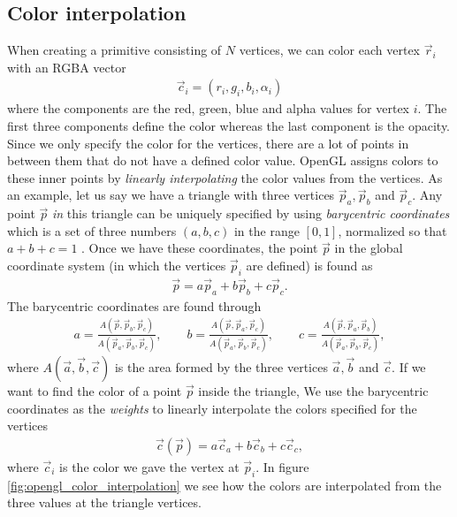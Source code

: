 \subsection{Color interpolation}
\label{sec:opengl_color_interpolation}
When creating a primitive consisting of $N$ vertices, we can color each vertex $\vec r_i$ with an RGBA vector
\begin{align}
	\vec c_i = (r_i, g_i, b_i, \alpha_i)
\end{align}
where the components are the red, green, blue and alpha values for vertex $i$. The first three components define the color whereas the last component is the opacity. Since we only specify the color for the vertices, there are a lot of points in between them that do not have a defined color value. OpenGL assigns colors to these inner points by \textit{linearly interpolating} the color values from the vertices. As an example, let us say we have a triangle with three vertices $\vec p_a, \vec p_b$ and $\vec p_c$. Any point $\vec p$ \textit{in} this triangle can be uniquely specified by using \textit{barycentric coordinates} which is a set of three numbers $(a,b,c)$ in the range $[0,1]$, normalized so that $a+b+c=1$ \cite{misc:opengl_es_specification}. Once we have these coordinates, the point $\vec p$ in the global coordinate system (in which the vertices $\vec p_i$ are defined) is found as
\begin{align}
	\vec p = a\vec p_a + b\vec p_b + c\vec p_c.
\end{align}
The barycentric coordinates are found through
\begin{align}
	a = \frac{A(\vec p, \vec p_b, \vec p_c)}{A(\vec p_a, \vec p_b, \vec p_c)}, \qquad b = \frac{A(\vec p, \vec p_a, \vec p_c)}{A(\vec p_a, \vec p_b, \vec p_c)}, \qquad c = \frac{A(\vec p, \vec p_a, \vec p_b)}{A(\vec p_a, \vec p_b, \vec p_c)},
\end{align}
where $A(\vec a, \vec b, \vec c)$ is the area formed by the three vertices $\vec a, \vec b$ and $\vec c$. If we want to find the color of a point $\vec p$ inside the triangle, We use the barycentric coordinates as the \textit{weights} to linearly interpolate the colors specified for the vertices
\begin{align}
	\vec c(\vec p) = a\vec c_a + b\vec c_b + c\vec c_c,
\end{align}
where $\vec c_i$ is the color we gave the vertex at $\vec p_i$. In figure \ref{fig:opengl_color_interpolation} we see how the colors are interpolated from the three values at the triangle vertices.
